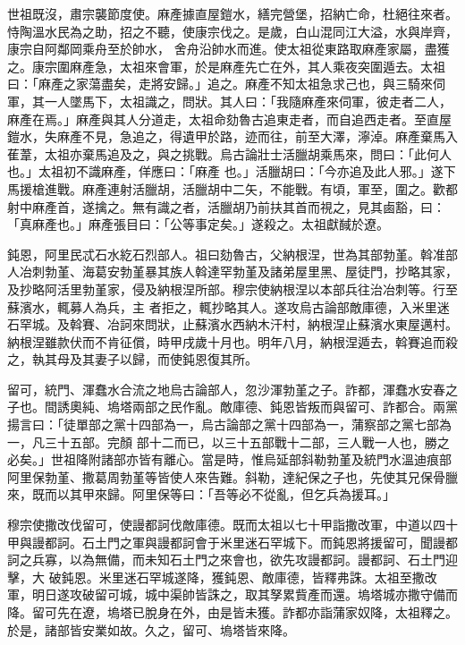\begin{pinyinscope}
 世祖既沒，肅宗襲節度使。麻產據直屋鎧水，繕完營堡，招納亡命，杜絕往來者。恃陶溫水民為之助，招之不聽，使康宗伐之。是歲，白山混同江大溢，水與岸齊，康宗自阿鄰岡乘舟至於帥水，
 舍舟沿帥水而進。使太祖從東路取麻產家屬，盡獲之。康宗圍麻產急，太祖來會軍，於是麻產先亡在外，其人乘夜突圍遁去。太祖曰：「麻產之家蕩盡矣，走將安歸。」追之。麻產不知太祖急求己也，與三騎來伺軍，其一人墜馬下，太祖識之，問狀。其人曰：「我隨麻產來伺軍，彼走者二人，麻產在焉。」麻產與其人分道走，太祖命劾魯古追東走者，而自追西走者。至直屋鎧水，失麻產不見，急追之，得遺甲於路，迹而往，前至大澤，濘淖。麻產棄馬入萑葦，太祖亦棄馬追及之，與之挑戰。烏古論壯士活臘胡乘馬來，問曰：「此何人也。」太祖初不識麻產，佯應曰：「麻產
 也。」活臘胡曰：「今亦追及此人邪。」遂下馬援槍進戰。麻產連射活臘胡，活臘胡中二矢，不能戰。有頃，軍至，圍之。歡都射中麻產首，遂擒之。無有識之者，活臘胡乃前扶其首而視之，見其鹵豁，曰：「真麻產也。」麻產張目曰：「公等事定矣。」遂殺之。太祖獻馘於遼。



 鈍恩，阿里民忒石水紇石烈部人。祖曰劾魯古，父納根涅，世為其部勃堇。斡准部人冶刺勃堇、海葛安勃堇暴其族人斡達罕勃堇及諸弟屋里黑、屋徒門，抄略其家，及抄略阿活里勃堇家，侵及納根涅所部。穆宗使納根涅以本部兵往治冶刺等。行至蘇濱水，輒募人為兵，主
 者拒之，輒抄略其人。遂攻烏古論部敵庫德，入米里迷石罕城。及斡賽、冶訶來問狀，止蘇濱水西納木汗村，納根涅止蘇濱水東屋邁村。納根涅雖款伏而不肯征償，時甲戌歲十月也。明年八月，納根涅遁去，斡賽追而殺之，執其母及其妻子以歸，而使鈍恩復其所。



 留可，統門、渾蠢水合流之地烏古論部人，忽沙渾勃堇之子。詐都，渾蠢水安春之子也。間誘奧純、塢塔兩部之民作亂。敵庫德、鈍恩皆叛而與留可、詐都合。兩黨揚言曰：「徒單部之黨十四部為一，烏古論部之黨十四部為一，蒲察部之黨七部為一，凡三十五部。完顏
 部十二而已，以三十五部戰十二部，三人戰一人也，勝之必矣。」世祖降附諸部亦皆有離心。當是時，惟烏延部斜勒勃堇及統門水溫迪痕部阿里保勃堇、撒葛周勃堇等皆使人來告難。斜勒，達紀保之子也，先使其兄保骨臘來，既而以其甲來歸。阿里保等曰：「吾等必不從亂，但乞兵為援耳。」



 穆宗使撒改伐留可，使謾都訶伐敵庫德。既而太祖以七十甲詣撒改軍，中道以四十甲與謾都訶。石土門之軍與謾都訶會于米里迷石罕城下。而鈍恩將援留可，聞謾都訶之兵寡，以為無備，而未知石土門之來會也，欲先攻謾都訶。謾都訶、石土門迎擊，大
 破鈍恩。米里迷石罕城遂降，獲鈍恩、敵庫德，皆釋弗誅。太祖至撒改軍，明日遂攻破留可城，城中渠帥皆誅之，取其孥累貲產而還。塢塔城亦撒守備而降。留可先在遼，塢塔已脫身在外，由是皆未獲。詐都亦詣蒲家奴降，太祖釋之。於是，諸部皆安業如故。久之，留可、塢塔皆來降。




\end{pinyinscope}
